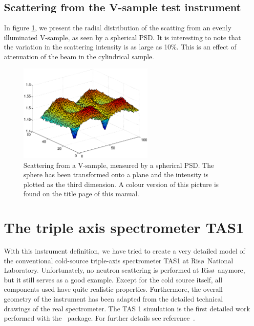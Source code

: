 \subsection{Scattering from the V-sample test instrument}
\label{s:vanadium-result}

In figure \ref{f:V-results}, we present the radial distribution 
of the scatting from an evenly illuminated V-sample,
as seen by a spherical PSD.
It is interesting to note that the variation in the
scattering intensity is as large as 10\%. This is an effect
of attenuation of the beam in the cylindrical sample.

\begin{figure}
  \begin{center}
    \includegraphics[width=0.6\textwidth]{figures/vanadium-surf-2.eps}
  \end{center}
\caption{Scattering from a V-sample, measured by a spherical
  PSD. The sphere has been transformed onto a plane and the intensity is
  plotted as the third dimension. A colour version of this picture is
  found on the title page of this manual.}
\label{f:V-results}
\end{figure}



\section{The triple axis spectrometer TAS1}
\label{s:TAS1}
With this instrument definition, we have tried to create
a very detailed model of the conventional cold-source
triple-axis spectrometer TAS1 at Ris\o\ National Laboratory.
Unfortunately, no neutron scattering is performed at Ris\o\
anymore, but it still serves as a good example.
Except for the cold source itself, all components 
used have quite realistic properties. Furthermore, the overall
geometry of the instrument has been adapted from
the detailed technical drawings of the real spectrometer.
The TAS 1 simulation is the first detailed work
performed with the \MCS\ package.%
For further details see reference~\cite{tas1_report}.

